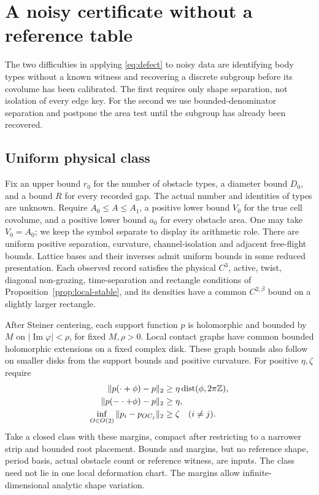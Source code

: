 \section{A noisy certificate without a reference table}\label{sec:uniform}
The two difficulties in applying \eqref{eq:defect} to noisy data are
identifying body types without a known witness and recovering a discrete
subgroup before its covolume has been calibrated. The first requires
only shape separation, not isolation of every edge key. For the second
we use bounded-denominator separation and postpone the area test until
the subgroup has already been recovered.

\subsection{Uniform physical class}
Fix an upper bound $r_0$ for the number of obstacle types, a diameter
bound $D_0$, and a bound $R$ for every recorded gap. The actual number
and identities of types are unknown. Require $A_0\le A\le A_1$, a
positive lower bound $V_0$ for the true cell covolume, and a positive
lower bound $a_0$ for every obstacle area. One may take $V_0=A_0$;
we keep the symbol separate to display its arithmetic role. There are
uniform positive separation, curvature, channel-isolation and adjacent
free-flight bounds. Lattice bases and their inverses admit uniform bounds
in some reduced presentation. Each observed record satisfies the physical
$C^3$, active, twist, diagonal non-grazing, time-separation and rectangle
conditions of Proposition~\ref{prop:local-stable}, and its densities
have a common $C^{2,\beta}$ bound on a slightly larger rectangle.

After Steiner centering, each support function $p$ is holomorphic and
bounded by $M$ on $|\operatorname{Im}\varphi|<\rho$, for fixed
$M,\rho>0$. Local contact graphs have common bounded holomorphic
extensions on a fixed complex disk. These graph bounds also follow
on smaller disks from the support bounds and positive curvature.
For positive $\eta,\zeta$ require
\begin{align}
 \|p(\cdot+\phi)-p\|_2&\ge
            \eta\operatorname{dist}(\phi,2\pi\mathbb Z),\label{eq:rotation}\\
 \|p(-\cdot+\phi)-p\|_2&\ge\eta,\label{eq:reflection}\\
 \inf_{O\in O(2)}\|p_i-p_{OC_j}\|_2&\ge\zeta\quad(i\ne j).
                                                   \label{eq:shape-separation}
\end{align}
Take a closed class with these margins, compact after restricting to a
narrower strip and bounded root placement. Bounds and margins, but no
reference shape, period basis, actual obstacle count or reference witness,
are inputs. The class need not lie in one local deformation chart.
The margins allow infinite-dimensional analytic shape variation.

